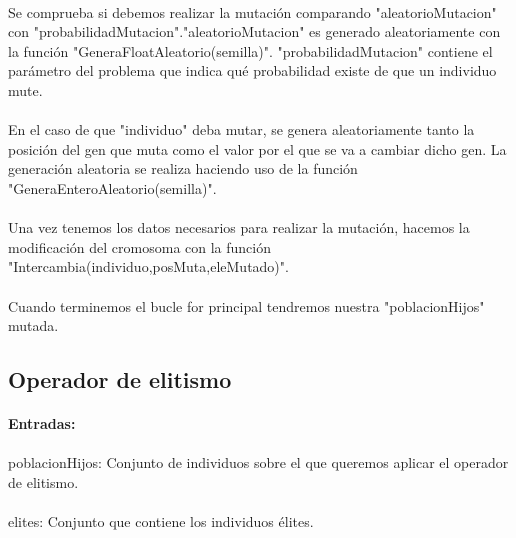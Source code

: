 	\paragraph{}Se comprueba si debemos realizar la mutación comparando "aleatorioMutacion" con "probabilidadMutacion"."aleatorioMutacion" es generado aleatoriamente con la función "GeneraFloatAleatorio(semilla)". "probabilidadMutacion" contiene el parámetro del problema que indica qué probabilidad existe de que un individuo mute.
	
	\paragraph{}En el caso de que "individuo" deba mutar, se genera aleatoriamente tanto la posición del gen que muta como el valor por el que se va a cambiar dicho gen. La generación aleatoria se realiza haciendo uso de la función "GeneraEnteroAleatorio(semilla)".
	
	\paragraph{}Una vez tenemos los datos necesarios para realizar la mutación, hacemos la modificación del cromosoma con la función "Intercambia(individuo,posMuta,eleMutado)".
	
	\paragraph{}Cuando terminemos el bucle for principal tendremos nuestra "poblacionHijos" mutada.
	
	\subsection{Operador de elitismo}
	
	\paragraph{Entradas:}
	
	\paragraph{}poblacionHijos: Conjunto de individuos sobre el que queremos aplicar el operador de elitismo.
	
	\paragraph{}elites: Conjunto que contiene los individuos élites.
	
